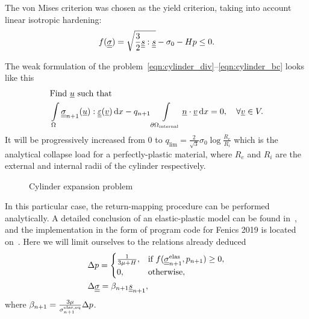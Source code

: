 \documentclass[12pt]{article}
\begin{document}
The von Mises criterion was chosen as the yield criterion, taking into account linear isotropic hardening:
\begin{equation}\label{eqn:cylinder_von_mises}
    f(\underline{\underline{\sigma}}) = \sqrt{\frac{3}{2} \underline{\underline{s}} : \underline{\underline{s}}} - \sigma_0 - Hp \leq 0.
\end{equation}

The weak formulation of the problem~\eqref{eqn:cylinder_div}--\eqref{eqn:cylinder_bc} looks like this
\begin{align}
    & \text{Find } \underline{u} \text{ such that} \label{eqn:cylinder_var_1} \\
    & \int\limits_\Omega\underline{\underline{\sigma}}_{n+1}(\underline{u}) : \underline{\underline{\varepsilon}}(\underline{v}) \, \mathrm{d} x - q_{n+1}\int\limits_{\partial\Omega_\text{internal}}\underline{n} \cdot \underline{v} \, \mathrm{d} x = 0, \quad \forall \underline{v} \in V. \label{eqn:cylinder_var_2}
\end{align}
It will be progressively increased from 0 to $q_\text{lim} = \frac{2}{\sqrt{3}}\sigma_0\log{\frac{R_e}{R_i}}$ which is the analytical collapse load for a perfectly-plastic material, where $R_e$ and $R_i$ are the external and internal radii of the cylinder respectively.

\begin{figure}[H]
    \begin{minipage}[h]{0.5\linewidth}
    \end{minipage}
    \hfill
    \begin{minipage}[h]{0.5\linewidth}
    \end{minipage}
    \caption{Cylinder expansion problem}
    \label{fig:domain}
\end{figure}

In this particular case, the return-mapping procedure can be performed analytically. A detailed conclusion of an elastic-plastic model can be found in~\parencite{bonnet:hal-01083772}, and the implementation in the form of program code for Fenics 2019 is located on~\parencite{bleyer2018numericaltours}. Here we will limit ourselves to the relations already deduced
\begin{align}
    &\Delta p = 
    \begin{cases}
        \frac{1}{3\mu + H}, & \text{if } f(\underline{\underline{\sigma}}^\text{elas}_{n+1}, p_{n+1}) \geq 0,\\
        0, & \text{otherwise},
    \end{cases} \label{eqn:dp_von_mises}\\
    &\Delta\underline{\underline{\sigma}} = \beta_{n+1}\underline{\underline{s}}_{n+1}, \label{eqn:dsigma_von_mises}
\end{align}
where $\beta_{n+1} = \frac{3\mu}{\sigma_{n+1}^\text{elas,eq}}\Delta p$.
\end{document}

